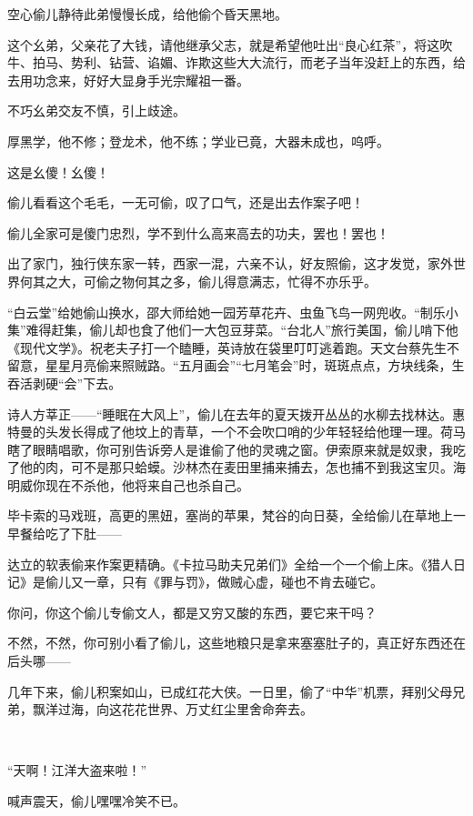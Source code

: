 \par 空心偷儿静待此弟慢慢长成，给他偷个昏天黑地。
\par 这个幺弟，父亲花了大钱，请他继承父志，就是希望他吐出“良心红茶”，将这吹牛、拍马、势利、钻营、谄媚、诈欺这些大大流行，而老子当年没赶上的东西，给去用功念来，好好大显身手光宗耀祖一番。
\par 不巧幺弟交友不慎，引上歧途。
\par 厚黑学，他不修；登龙术，他不练；学业已竟，大器未成也，呜呼。
\par 这是幺傻！幺傻！
\par 偷儿看看这个毛毛，一无可偷，叹了口气，还是出去作案子吧！
\par 偷儿全家可是傻门忠烈，学不到什么高来高去的功夫，罢也！罢也！
\par 出了家门，独行侠东家一转，西家一混，六亲不认，好友照偷，这才发觉，家外世界何其之大，可偷之物何其之多，偷儿得意满志，忙得不亦乐乎。
\par “白云堂”给她偷山换水，邵大师给她一园芳草花卉、虫鱼飞鸟一网兜收。“制乐小集”难得赶集，偷儿却也食了他们一大包豆芽菜。“台北人”旅行美国，偷儿啃下他《现代文学》。祝老夫子打一个瞌睡，英诗放在袋里叮叮逃着跑。天文台蔡先生不留意，星星月亮偷来照贼路。“五月画会”“七月笔会”时，斑斑点点，方块线条，生吞活剥硬“会”下去。
\par 诗人方莘正——“睡眠在大风上”，偷儿在去年的夏天拨开丛丛的水柳去找林达。惠特曼的头发长得成了他坟上的青草，一个不会吹口哨的少年轻轻给他理一理。荷马瞎了眼睛唱歌，你可别告诉旁人是谁偷了他的灵魂之窗。伊索原来就是奴隶，我吃了他的肉，可不是那只蛤蟆。沙林杰在麦田里捕来捕去，怎也捕不到我这宝贝。海明威你现在不杀他，他将来自己也杀自己。
\par 毕卡索的马戏班，高更的黑妞，塞尚的苹果，梵谷的向日葵，全给偷儿在草地上一早餐给吃了下肚——
\par 达立的软表偷来作案更精确。《卡拉马助夫兄弟们》全给一个一个偷上床。《猎人日记》是偷儿又一章，只有《罪与罚》，做贼心虚，碰也不肯去碰它。
\par 你问，你这个偷儿专偷文人，都是又穷又酸的东西，要它来干吗？
\par 不然，不然，你可别小看了偷儿，这些地粮只是拿来塞塞肚子的，真正好东西还在后头哪——
\par 几年下来，偷儿积案如山，已成红花大侠。一日里，偷了“中华”机票，拜别父母兄弟，飘洋过海，向这花花世界、万丈红尘里舍命奔去。
\par  
\par “天啊！江洋大盗来啦！”
\par 喊声震天，偷儿嘿嘿冷笑不已。
\par  
